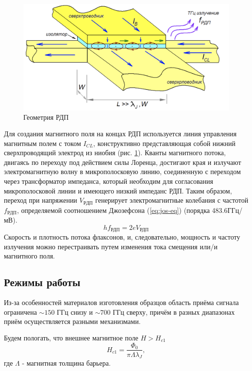 \documentclass[12pt,a4paper]{article}
\begin{document}
\begin{figure}[H]
    \centering
    \includegraphics[scale = 0.5]{FFO.png}
    \caption{Геометрия РДП}
    \label{FFO}
\end{figure}

Для создания магнитного поля на концах РДП используется линия управления магнитным полем с током $I_{CL}$, конструктивно представляющая собой нижний сверхпроводящий электрод из ниобия (рис. \ref{FFO}). Кванты магнитного потока, двигаясь по переходу под действием силы Лоренца, достигают края и излучают электромагнитную волну в микрополосковую линию, соединенную с переходом через трансформатор импеданса, который необходим для согласования микрополосковой линии и имеющего низкий импеданс РДП. Таким образом, переход при напряжении $V_{РДП}$ генерирует электромагнитные колебания с частотой $f_{РДП}$, определяемой соотношением Джозефсона (\ref{eq:jos-eq}) (порядка 483.6ГГц/мВ).
\begin{equation}
    h f_{\text{РДП}} = 2 e V_{\text{РДП}}
    \label{eq:jos-eq}
\end{equation}
Скорость и плотность потока флаксонов, и, следовательно, мощность и частоту излучения можно перестраивать путем изменения тока смещения или/и магнитного поля.

\subsection{Режимы работы}

Из-за особенностей материалов изготовления образцов область приёма сигнала ограничена $\sim150$ ГГц снизу и $\sim700$ ГГц сверху, причём в разных диапазонах приём осуществляется разными механизмами. \par 

Будем пологать, что внешнее магнитное поле $H > H_{c1}$
\begin{equation}
   H_{c1} = \frac{\varPhi_0}{\pi \Lambda \lambda_J}, 
\end{equation}
где $\Lambda$ - магнитная толщина барьера. \par
\end{document}

